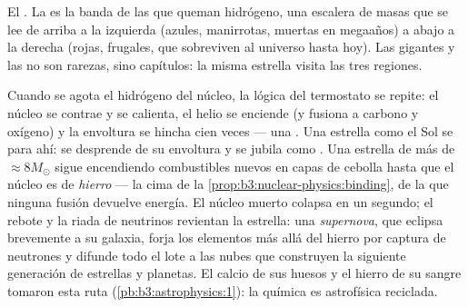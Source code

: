 \begin{omfigure}

{\small El . La  es la
banda de las que queman hidrógeno, una escalera de masas que se lee de arriba a la izquierda (azules,
manirrotas, muertas en megaaños) a abajo a la derecha (rojas, frugales,
que sobreviven al universo hasta hoy). Las gigantes y las  no son
rarezas, sino capítulos: la misma estrella visita las tres regiones.}
\end{omfigure}

\begin{remark}\label{rem:b3:astrophysics:evolution}
Cuando se agota el hidrógeno del núcleo, la lógica del termostato se repite:
el núcleo se contrae y se calienta, el helio se enciende (y fusiona a carbono
y oxígeno) y la envoltura se hincha cien veces --- una .
Una estrella como el Sol se para ahí: se desprende de su envoltura y se jubila
como . Una estrella de más de $\approx8M_\odot$ sigue encendiendo
combustibles nuevos en capas de cebolla hasta que el núcleo es de \emph{hierro} ---
la cima de la \cref{prop:b3:nuclear-physics:binding}, de la que ninguna
fusión devuelve energía. El núcleo muerto colapsa en un segundo; el
rebote y la riada de neutrinos revientan la estrella: una
\emph{supernova}, que eclipsa brevemente a su galaxia, forja los
elementos más allá del hierro por captura de neutrones y difunde todo el lote
a las nubes que construyen la siguiente generación de estrellas y
planetas. El calcio de sus huesos y el hierro de su sangre
tomaron esta ruta (\cref{pb:b3:astrophysics:1}): la química es
astrofísica reciclada.
\end{remark}

